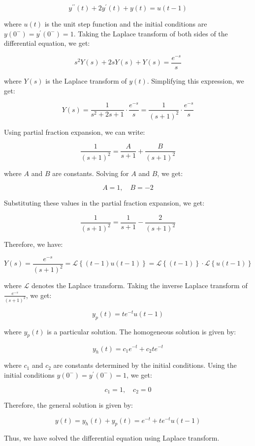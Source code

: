 \documentclass[main.tex]{subfiles}
\begin{document}
\begin{enumerate}
$$
y^{\prime \prime}(t)+2 y^{\prime}(t)+y(t)=u(t-1)
$$

where $u(t)$ is the unit step function and the initial conditions are $y\left(0^{-}\right)=y^{\prime}\left(0^{-}\right)=1$. Taking the Laplace transform of both sides of the differential equation, we get:

$$
s^{2} Y(s)+2 s Y(s)+Y(s)=\frac{e^{-s}}{s}
$$

where $Y(s)$ is the Laplace transform of $y(t)$. Simplifying this expression, we get:

$$
Y(s)=\frac{1}{s^{2}+2 s+1} \cdot \frac{e^{-s}}{s}=\frac{1}{(s+1)^{2}} \cdot \frac{e^{-s}}{s}
$$

Using partial fraction expansion, we can write:

$$
\frac{1}{(s+1)^{2}}=\frac{A}{s+1}+\frac{B}{(s+1)^{2}}
$$

where $A$ and $B$ are constants. Solving for $A$ and $B$, we get:

$$
A=1, \quad B=-2
$$

Substituting these values in the partial fraction expansion, we get:

$$
\frac{1}{(s+1)^{2}}=\frac{1}{s+1}-\frac{2}{(s+1)^{2}}
$$

Therefore, we have:

$$
Y(s)=\frac{e^{-s}}{(s+1)^{2}}=\mathcal{L}\left\{\left(t-1\right) u(t-1)\right\}=\mathcal{L}\left\{\left(t-1\right)\right\} \cdot \mathcal{L}\left\{u(t-1)\right\}
$$

where $\mathcal{L}$ denotes the Laplace transform. Taking the inverse Laplace transform of $\frac{e^{-s}}{(s+1)^{2}}$, we get:

$$
y_{p}(t)=t e^{-t} u(t-1)
$$

where $y_{p}(t)$ is a particular solution. The homogeneous solution is given by:

$$
y_{h}(t)=c_{1} e^{-t}+c_{2} t e^{-t}
$$

where $c_{1}$ and $c_{2}$ are constants determined by the initial conditions. Using the initial conditions $y\left(0^{-}\right)=y^{\prime}\left(0^{-}\right)=1$, we get:

$$
c_{1}=1, \quad c_{2}=0
$$

Therefore, the general solution is given by:

$$
y(t)=y_{h}(t)+y_{p}(t)=e^{-t}+t e^{-t} u(t-1)
$$

Thus, we have solved the differential equation using Laplace transform.

\end{enumerate}
\end{document}
